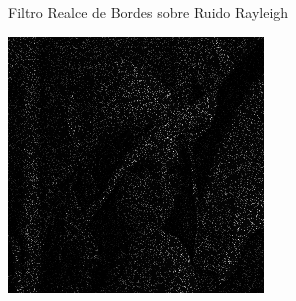 \documentclass{beamer}
\begin{document}
\begin{frame}[fragile]{Filtro Realce de Bordes sobre Ruido Rayleigh}
\begin{minipage}{0.25\linewidth}
	\end{minipage}\hfill
	\begin{minipage}{0.25\linewidth}
		\centering
		\includegraphics[width=\linewidth]{../results/lena_rayleigh_xi10}
	\end{minipage}
	

\end{frame}
\end{document}
